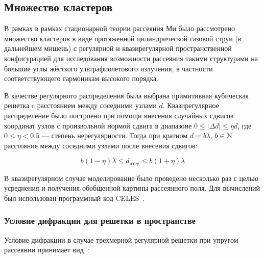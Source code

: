 \subsection{Множество кластеров}

В рамках в рамках стационарной теории рассеяния Ми было рассмотрено множество кластеров в виде протяженной цилиндрической газовой струи (в дальнейшем мишень) с регулярной и квазирегулярной пространственной конфигурацией для исследования возможности рассеяния такими структурами на большие углы жёсткого ультрафиолетового излучения, в частности соответствующего гармоникам высокого порядка.

В качестве регулярного распределения была выбрана примитивная кубическая решетка c расстоянием между соседними узлами $d$. Квазирегулярное распределение было построено при помощи внесения случайных сдвигов координат узлов с произвольной нормой сдвига в диапазоне $0 \leq |\Delta d| \leq \eta d$, где $0 \leq \eta < 0.5$ --- степень нерегулярности. Тогда при кратном $d = b\lambda$, $b \in \EuScript{N}$ расстояние между соседними узлами после внесения сдвигов:

    \begin{equation}
        b\left(1 - \eta\right)\lambda \le d_{\textrm{irreg}} \le b\left(1 + \eta\right)\lambda
    \end{equation}

В квазирегулярном случае моделирование было проведено несколько раз с целью усреднения и получения обобщенной картины рассеянного поля. Для вычислений был использован программный код CELES~\cite{celes}.

\subsubsection{Условие дифракции для решетки в пространстве}


Условие дифракции в случае трехмерной регулярной решетки при упругом рассеянии принимает вид~\cite{Kittel86}:

